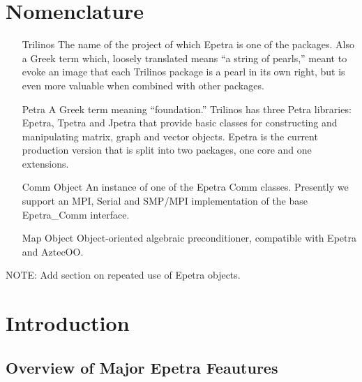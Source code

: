 \documentclass[12pt,relax]{EpetraUserGuide}
\begin{document}
\section*{Nomenclature}
\begin{itemize}
\item[Trilinos]
The name of the project of which Epetra is one of the packages.  Also a Greek term which,
loosely translated means ``a string of pearls,'' 
meant to evoke an image that each Trilinos package is a pearl in its 
own right, but is even more valuable when combined with other 
packages.
\item[Petra]
A Greek term meaning ``foundation.''  Trilinos has three Petra 
libraries: Epetra, Tpetra and Jpetra that provide basic classes 
for constructing and manipulating matrix, graph and vector
objects.  Epetra is the current production version that is
split into two packages, one core and one extensions.
\item[Comm Object]
An instance of one of the Epetra Comm classes.  Presently we support
an MPI, Serial and SMP/MPI implementation of the base Epetra_Comm interface.
\item[Map Object] 
Object-oriented algebraic preconditioner, compatible with 
Epetra and AztecOO.
\end{itemize}

NOTE: Add section on repeated use of Epetra objects.


\section{Introduction}
\label{Section:Introduction}


\subsection{Overview of Major Epetra Feautures}
\end{document}
